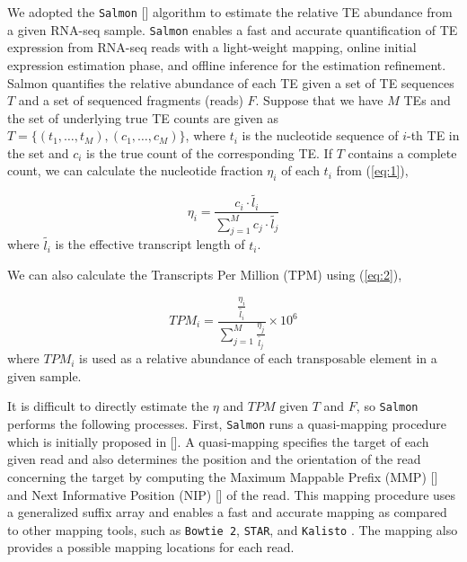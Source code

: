 \documentclass[wsdraft]{ws-procs11x85}
\begin{document}
We adopted the \texttt{Salmon} [] algorithm to estimate the relative TE abundance from a given RNA-seq sample. \texttt{Salmon} enables a fast and accurate quantification of TE expression from RNA-seq reads with a light-weight mapping, online initial expression estimation phase, and offline inference for the estimation refinement.\cite{patro2017salmon,srivastava2016rapmap,bishop2006pattern,foulds2013stochastic} 
Salmon quantifies the relative abundance of each TE given a set of TE sequences $T$ and a set of sequenced fragments (reads) $F$.
Suppose that we have $M$ TEs and the set of underlying true TE counts are given as $T = \{(t_1, \dots , t_M), (c_1, \dots, c_M) \}$, where $t_i$ is the nucleotide sequence of $i$-th TE in the set and $c_i$ is the true count of the corresponding TE. If $T$ contains a complete count, we can calculate the nucleotide fraction $\eta_i$ of each $t_i$ from (\ref{eq:1}),

\begin{equation} \label{eq:1}
\eta_i = \frac{c_i \cdot \widetilde{l_i} }{\sum_{j=1}^{M} c_j \cdot \widetilde{l_j}}
\end{equation}
where $\widetilde{l_i}$ is the effective transcript length of $t_i$\cite{li2009rna}.

We can also calculate the Transcripts Per Million (TPM) using (\ref{eq:2}),

\begin{equation} \label{eq:2}
TPM_i = \frac{ \frac{\eta_i }{\widetilde{l_i}} }
{\sum_{j=1}^{M} \frac{\eta_j }{\widetilde{l_j}} }\times 10^6
\end{equation}
where $TPM_i$ is used as a relative abundance of each transposable element in a given sample. 

It is difficult to directly estimate the $\eta$ and $TPM$ given $T$ and $F$, so \texttt{Salmon} performs the following processes. First,
\texttt{Salmon} runs a quasi-mapping procedure which is initially proposed in []. A quasi-mapping specifies the target of each given read and also determines the position and the orientation of the read concerning the target by computing the
Maximum Mappable Prefix (MMP) [] and Next Informative Position (NIP) [] of the read.
This mapping procedure uses a generalized suffix array \cite{manber1993suffix} and enables a fast and accurate mapping as compared to other mapping tools, such as \texttt{Bowtie 2}, \texttt{STAR}, and \texttt{Kalisto} \cite{srivastava2016rapmap}. The mapping also provides a possible mapping locations for each read.
\end{document}
